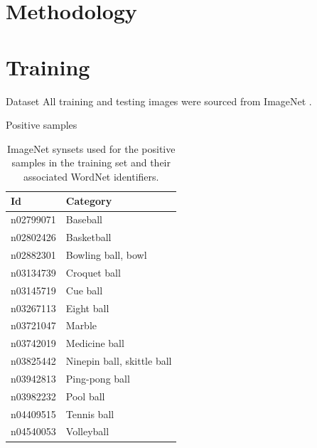 \documentclass{beamer}
\begin{document}
\section{Methodology}

\section{Training}

\begin{frame}{Dataset}
	All training and testing images were sourced from ImageNet \citep{imagenet_cvpr09}.
\end{frame}

\begin{frame}{Positive samples}
	\begin{table}[H]
		\footnotesize
		\centering
		\caption{ImageNet synsets used for the positive samples in the training set and their associated WordNet \citep{fellbaum1998wordnet} identifiers.}
		\label{tab:postraining}
		\begin{tabularx}{\textwidth}{lX}
			\toprule
			\textbf{Id} & \textbf{Category} \\
			\midrule
			n02799071 & Baseball \\
			n02802426 & Basketball \\
			n02882301 & Bowling ball, bowl \\
			n03134739 & Croquet ball \\
			n03145719 & Cue ball \\
			n03267113 & Eight ball \\
			n03721047 & Marble \\
			n03742019 & Medicine ball \\
			n03825442 & Ninepin ball, skittle ball \\
			n03942813 & Ping-pong ball \\
			n03982232 & Pool ball \\
			n04409515 & Tennis ball \\
			n04540053 & Volleyball \\
			\bottomrule
		\end{tabularx}
	\end{table}
\end{frame}
\end{document}
